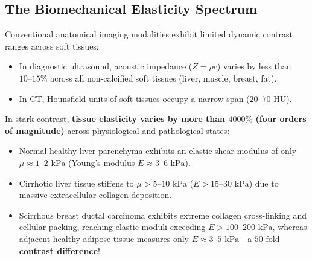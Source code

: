 \documentclass[11pt,a4paper]{article}
\begin{document}
\subsection{The Biomechanical Elasticity Spectrum}
Conventional anatomical imaging modalities exhibit limited dynamic contrast ranges across soft tissues:
\begin{itemize}
    \item In diagnostic ultrasound, acoustic impedance ($Z = \rho c$) varies by less than $10\text{--}15\%$ across all non-calcified soft tissues (liver, muscle, breast, fat).
    \item In CT, Hounsfield units of soft tissues occupy a narrow span ($20\text{--}70\text{ HU}$).
\end{itemize}
In stark contrast, \textbf{tissue elasticity varies by more than $4000\%$ (four orders of magnitude)} across physiological and pathological states:
\begin{itemize}
    \item Normal healthy liver parenchyma exhibits an elastic shear modulus of only $\mu \approx 1\text{--}2\text{ kPa}$ (Young's modulus $E \approx 3\text{--}6\text{ kPa}$).
    \item Cirrhotic liver tissue stiffens to $\mu > 5\text{--}10\text{ kPa}$ ($E > 15\text{--}30\text{ kPa}$) due to massive extracellular collagen deposition.
    \item Scirrhous breast ductal carcinoma exhibits extreme collagen cross-linking and cellular packing, reaching elastic moduli exceeding $E > 100\text{--}200\text{ kPa}$, whereas adjacent healthy adipose tissue measures only $E \approx 3\text{--}5\text{ kPa}$---a \textbf{$50\text{-fold}$ contrast difference}!
\end{itemize}
\end{document}
